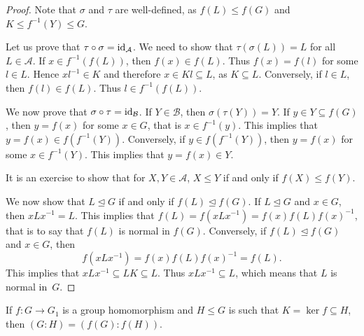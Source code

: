 \begin{proof}
    Note that $\sigma$ and $\tau$ are well-defined, as 
    $f(L)\leq f(G)$ and $K\leq f^{-1}(Y)\leq G$.

    Let us prove that $\tau\circ\sigma=\operatorname{id}_\mathcal{A}$. We need to show that $\tau(\sigma(L))=L$ for all $L\in\mathcal{A}$. If $x\in f^{-1}(f(L))$, then $f(x)\in f(L)$. Thus $f(x)=f(l)$ for some
    $l\in L$. Hence $xl^{-1}\in K$ and therefore 
    $x\in Kl\subseteq L$, as $K\subseteq L$.
    Conversely, if $l\in L$, then $f(l)\in f(L)$. Thus $l\in f^{-1}(f(L))$.

    We now prove that $\sigma\circ\tau=\operatorname{id}_\mathcal{B}$. If  $Y\in\mathcal{B}$, then $\sigma(\tau(Y))=Y$. If $y\in Y\subseteq f(G)$, then $y=f(x)$ for some $x\in G$, that is $x\in f^{-1}(y)$. This implies that $y=f(x)\in f(f^{-1}(Y))$. Conversely, if $y\in f(f^{-1}(Y))$, then $y=f(x)$ for some $x\in f^{-1}(Y)$. This implies that $y=f(x)\in Y$.

    It is an exercise to show that 
    for $X,Y\in\mathcal{A}$, 
    $X\leq Y$ if and only if $f(X)\leq f(Y)$.

    We now show that $L\unlhd G$ if and only if 
    $f(L)\unlhd f(G)$. If $L\unlhd G$ and $x\in G$,
    then $xLx^{-1}=L$. This implies that $f(L)=f(xLx^{-1})=f(x)f(L)f(x)^{-1}$, that is
    to say that $f(L)$ is normal in $f(G)$. Conversely, if
    $f(L)\unlhd f(G)$ and $x\in G$, then 
        \[
        f(xLx^{-1})=f(x)f(L)f(x)^{-1}=f(L).
        \]
    This implies that $xLx^{-1}\subseteq LK\subseteq L$. Thus 
    $xLx^{-1}\subseteq L$, which means that $L$ is normal in~$G$. 
\end{proof}

\begin{proposition}
    If $f\colon G\to G_1$ is a group homomorphism 
    and $H\leq G$ is such that $K=\ker f
\subseteq H$, then
        $(G:H)=(f(G):f(H))$.
\end{proposition}

